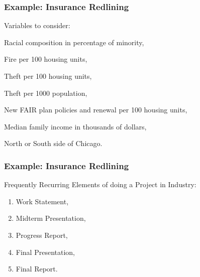 \documentclass[hyperref={colorlinks=false},compress,handout,10pt]{beamer}
\let\olditem\item
\renewcommand{\item}{\setlength{\itemsep}{0.5\baselineskip}\olditem}
\begin{document}
\begin{frame}
    \frametitle{Example: Insurance Redlining}
    Variables to consider:
    \begin{description}
        \item[\texttt{race}] Racial composition in percentage of minority,
        \item[\texttt{fire}] Fire per 100 housing units,
        \item[\texttt{theft}] Theft per 100 housing units,
        \item[\texttt{age}] Theft per 1000 population,
        \item[\texttt{involact}] New FAIR plan policies and renewal per 100 housing units,
        \item[\texttt{income}] Median family income in thousands of dollars,
        \item[\texttt{side}] North or South side of Chicago.
    \end{description}
\end{frame}

\begin{frame}
    \frametitle{Example: Insurance Redlining}
    Frequently Recurring Elements of doing a Project in Industry:
    \vspace{7pt}
             \begin{enumerate}
                 \item Work Statement,
                 \item Midterm Presentation,
                 \item Progress Report,
                 \item Final Presentation,
                 \item Final Report.
             \end{enumerate}
\end{frame}
\end{document}
